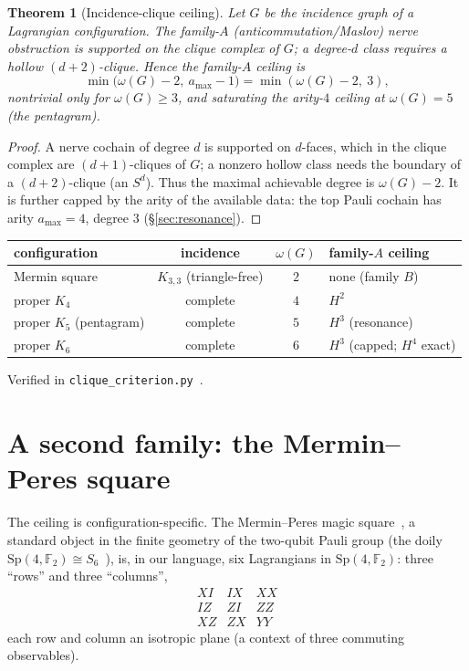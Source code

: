 \documentclass[11pt,a4paper]{article}
\newcommand{\Sp}{\mathrm{Sp}}
\newcommand{\F}{\mathbb{F}}
\theoremstyle{plain}
\newtheorem{theorem}{Theorem}[section]
\theoremstyle{definition}
\theoremstyle{remark}
\begin{document}
\begin{theorem}[Incidence-clique ceiling]\label{thm:clique}
Let $G$ be the incidence graph of a Lagrangian configuration.  The family-$A$
(anticommutation/Maslov) nerve obstruction is supported on the clique complex of
$G$; a degree-$d$ class requires a hollow $(d+2)$-clique.  Hence the family-$A$
ceiling is
\[
  \min\bigl(\omega(G)-2,\ a_{\max}-1\bigr)=\min(\omega(G)-2,\ 3),
\]
nontrivial only for $\omega(G)\ge3$, and saturating the arity-$4$ ceiling at
$\omega(G)=5$ (the pentagram).
\end{theorem}

\begin{proof}
A nerve cochain of degree $d$ is supported on $d$-faces, which in the clique complex
are $(d+1)$-cliques of $G$; a nonzero hollow class needs the boundary of a
$(d+2)$-clique (an $S^{d}$).  Thus the maximal achievable degree is $\omega(G)-2$.
It is further capped by the arity of the available data: the top Pauli cochain has
arity $a_{\max}=4$, degree $3$ (\S\ref{sec:resonance}).
\end{proof}

\begin{center}
\renewcommand{\arraystretch}{1.15}
\begin{tabular}{lccl}
\toprule
configuration & incidence & $\omega(G)$ & family-$A$ ceiling \\
\midrule
Mermin square & $K_{3,3}$ (triangle-free) & $2$ & none (family $B$) \\
proper $K_4$ & complete & $4$ & $H^2$ \\
proper $K_5$ (pentagram) & complete & $5$ & $H^3$ (resonance) \\
proper $K_6$ & complete & $6$ & $H^3$ (capped; $H^4$ exact) \\
\bottomrule
\end{tabular}
\end{center}
\noindent Verified in \texttt{clique\_criterion.py}~\cite{PaperXXIIsuppl}.

\section{A second family: the Mermin--Peres square}\label{sec:square}

The ceiling is configuration-specific.  The Mermin--Peres magic
square~\cite{Mermin}, a standard object in the finite geometry of the two-qubit
Pauli group (the doily $\Sp(4,\F_2)\cong S_6$~\cite{SanigaPlanat,VeldkampTwoQubits}),
is, in our language, six Lagrangians in $\Sp(4,\F_2)$: three ``rows'' and three
``columns'',
\[
\begin{array}{ccc}
XI & IX & XX\\ IZ & ZI & ZZ\\ XZ & ZX & YY
\end{array}
\]
each row and column an isotropic plane (a context of three commuting observables).
\end{document}
